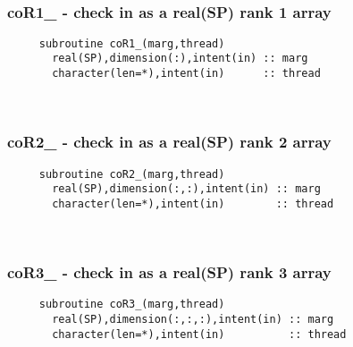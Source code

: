  
\mbox{}\hrulefill\ 
 
  \subsubsection{coR1\_ - check in as a real(SP) rank 1 array}

\begin{verbatim} 
     subroutine coR1_(marg,thread)
       real(SP),dimension(:),intent(in) :: marg
       character(len=*),intent(in)      :: thread
 \end{verbatim}%
 
 
\mbox{}\hrulefill\ 

  \subsubsection{coR2\_ - check in as a real(SP) rank 2 array}

\begin{verbatim} 
     subroutine coR2_(marg,thread)
       real(SP),dimension(:,:),intent(in) :: marg
       character(len=*),intent(in)        :: thread
 \end{verbatim}%
 
 
\mbox{}\hrulefill\ 
 
  \subsubsection{coR3\_ - check in as a real(SP) rank 3 array}

\begin{verbatim} 
     subroutine coR3_(marg,thread)
       real(SP),dimension(:,:,:),intent(in) :: marg
       character(len=*),intent(in)          :: thread
 \end{verbatim}%
 
